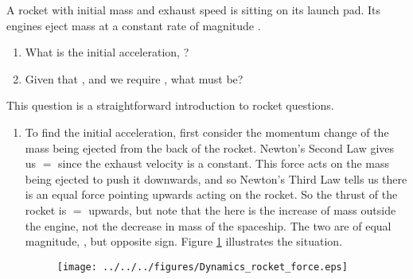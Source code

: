 
\begin{problem}[HE+_Rocket] %
{A rocket with initial mass  and exhaust speed  is sitting on its launch pad. Its engines eject mass at a constant rate of magnitude .
\begin{enumerate}
	\item What is the initial acceleration, ?
	\item Given that ,  and we require , what must \vari{\mu} be?
\end{enumerate}
}{
}{This question is a straightforward introduction to rocket questions.
\begin{enumerate}
	\item To find the initial acceleration, first consider the momentum change of the mass being ejected from the back of the rocket. Newton's Second Law gives us  $=$  since the exhaust velocity is a constant. This force acts on the mass being ejected to push it downwards, and so Newton's Third Law tells us there is an equal force pointing upwards acting on the rocket. So the thrust of the rocket is  $=$  upwards, but note that the  here is the increase of mass outside the engine, not the decrease in mass of the spaceship. The two are of equal magnitude, \vari{\mu}, but opposite sign. Figure \ref{fig:Dynamics_rocket_force} illustrates the situation.

\begin{figure}[h]
	\centering
	\texttt{[image: ../../../figures/Dynamics\_rocket\_force.eps]}
	\caption{}\label{fig:Dynamics_rocket_force}
\end{figure}


\end{enumerate}}
\end{problem}
